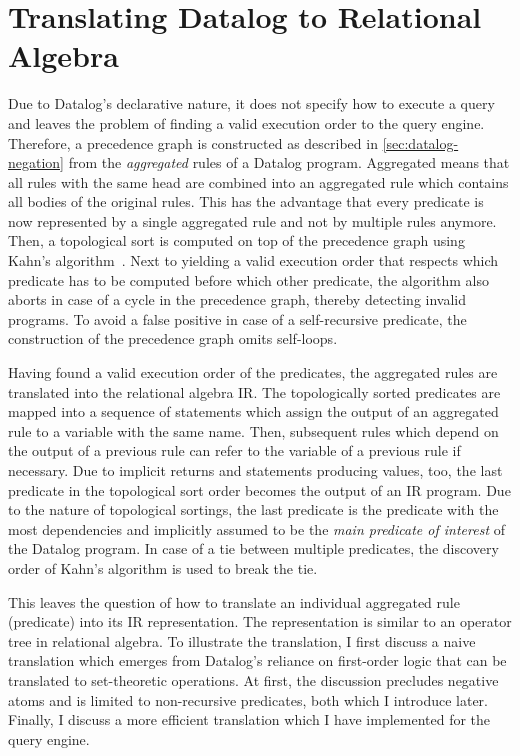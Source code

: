 \section{Translating Datalog to Relational Algebra}\label{sec:datalog-to-relational-algebra}

Due to Datalog's declarative nature, it does not specify how to execute a query
and leaves the problem of finding a valid execution order to the query engine.
Therefore, a precedence graph is constructed as described in \ref{sec:datalog-negation}
from the \emph{aggregated} rules of a Datalog program.
Aggregated means that all rules with the same head are combined into an
aggregated rule which contains all bodies of the original rules.
This has the advantage that every predicate is now represented by a single
aggregated rule and not by multiple rules anymore.
Then, a topological sort is computed on top of the precedence graph using
Kahn's algorithm~\cite{kahn1962topological}.
Next to yielding a valid execution order that respects which predicate has
to be computed before which other predicate, the algorithm also aborts in
case of a cycle in the precedence graph, thereby detecting invalid programs.
To avoid a false positive in case of a self-recursive predicate,
the construction of the precedence graph omits self-loops.

Having found a valid execution order of the predicates,
the aggregated rules are translated into the relational algebra \ac{IR}.
The topologically sorted predicates are mapped into a sequence of statements
which assign the output of an aggregated rule to a variable with the same name.
Then, subsequent rules which depend on the output of a previous rule can refer
to the variable of a previous rule if necessary.
Due to implicit returns and statements producing values, too,
the last predicate in the topological sort order becomes the output
of an \ac{IR} program.
Due to the nature of topological sortings, the last predicate is the
predicate with the most dependencies and implicitly assumed to be the
\emph{main predicate of interest} of the Datalog program.
In case of a tie between multiple predicates, the discovery order of Kahn's
algorithm is used to break the tie\footnotemark{}.


This leaves the question of how to translate an individual aggregated rule
(predicate) into its \ac{IR} representation.
The representation is similar to an operator tree in relational algebra.
To illustrate the translation, I first discuss a naive translation
which emerges from Datalog's reliance on first-order logic that can be
translated to set-theoretic operations.
At first, the discussion precludes negative atoms and is limited to
non-recursive predicates, both which I introduce later.
Finally, I discuss a more efficient translation which I have implemented for
the query engine.

